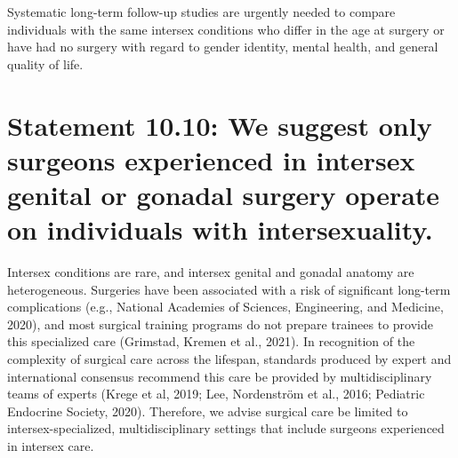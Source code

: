\documentclass[
]{book}
\begin{document}
Systematic long-term follow-up studies are urgently
needed to compare individuals with the same intersex conditions who differ in the age at surgery or
have had no surgery with regard to gender identity,
mental health, and general quality of life.

\hypertarget{statement-10.10-we-suggest-only-surgeons-experienced-in-intersex-genital-or-gonadal-surgery-operate-on-individuals-with-intersexuality.}{%
\section*{Statement 10.10: We suggest only surgeons experienced in intersex genital or gonadal surgery operate on individuals with intersexuality.}\label{statement-10.10-we-suggest-only-surgeons-experienced-in-intersex-genital-or-gonadal-surgery-operate-on-individuals-with-intersexuality.}}

Intersex conditions are rare, and intersex genital and gonadal anatomy are heterogeneous.
Surgeries have been associated with a risk of significant long-term complications (e.g., National
Academies of Sciences, Engineering, and Medicine,
2020), and most surgical training programs do
not prepare trainees to provide this specialized
care (Grimstad, Kremen et al., 2021). In recognition of the complexity of surgical care across
the lifespan, standards produced by expert and
international consensus recommend this care be
provided by multidisciplinary teams of experts
(Krege et al, 2019; Lee, Nordenström et al., 2016;
Pediatric Endocrine Society, 2020). Therefore, we
advise surgical care be limited to
intersex-specialized, multidisciplinary settings that
include surgeons experienced in intersex care.
\end{document}
